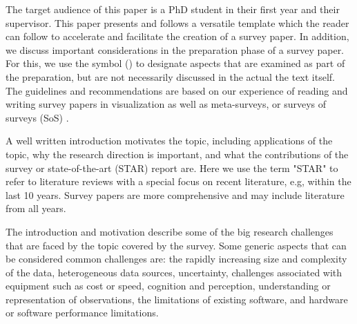 The target audience of this paper is a PhD student in their first year and their supervisor. This paper presents and follows a versatile template which the reader can follow to accelerate and facilitate the creation of a survey paper. In addition, we discuss important considerations in the preparation phase of a survey paper. For this, we use the symbol (\cons) to designate aspects that are examined as part of the preparation, but are not necessarily  discussed in the actual the text itself. The guidelines and recommendations are based on our experience of reading and writing survey papers in visualization \cite{post2003state, laramee2004state, laramee2007topology,  peng2009higher, mcloughlin2010over, edmunds2012surface, lipsa2012visualization, borgo2013glyph, chung2014glyph, tong2018storytelling, firat2018towards, roberts2018visualising, rees2019survey} as well as meta-surveys, or surveys of surveys (SoS) \cite{mcnabb2017sos, alharbi2017molecular, alharbi2018sos}.


 A well written introduction motivates the topic, including applications of the topic, why the research direction is important, and what the contributions of the survey or state-of-the-art (STAR) report are. Here we use the term "STAR" to refer to literature reviews with a special focus on recent literature, e.g, within the last 10 years. Survey papers are more comprehensive and may include literature from all years.

The introduction and motivation describe some of the big research challenges that are faced by the topic covered by the survey. Some generic aspects that can be considered common challenges are: the rapidly increasing size and complexity of the data, heterogeneous data sources, uncertainty, challenges associated with equipment such as cost or speed, cognition and perception, understanding or representation of observations, the limitations of existing software, and hardware or software performance limitations.

